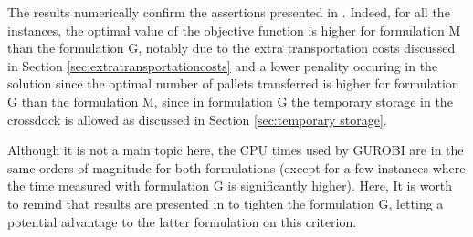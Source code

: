 \documentclass[preprint,12pt,authoryear]{elsarticle}
\begin{document}
\color{red}
The results numerically confirm the assertions presented in \citep{Gelareh2015,Gelareh2021}. Indeed, for all the instances, the optimal value of the objective function is higher for formulation M than the formulation G, notably due to the extra transportation costs discussed in Section \ref{sec:extratransportationcosts} and a lower penality occuring in the solution since the optimal number of pallets transferred is higher for formulation G than the formulation M, since in formulation G the temporary storage in the crossdock is allowed as discussed in Section \ref{sec:temporary storage}.

Although it is not a main topic here, the CPU times used by GUROBI are in the same orders of magnitude for both formulations (except for a few instances where the time measured with formulation G is significantly higher). Here, It is worth to remind that results are presented in \citep{Gelareh2015,GELAREH2016} to tighten the formulation G, letting a potential advantage to the latter formulation on this criterion.
 \color{black}
 
\end{document}
